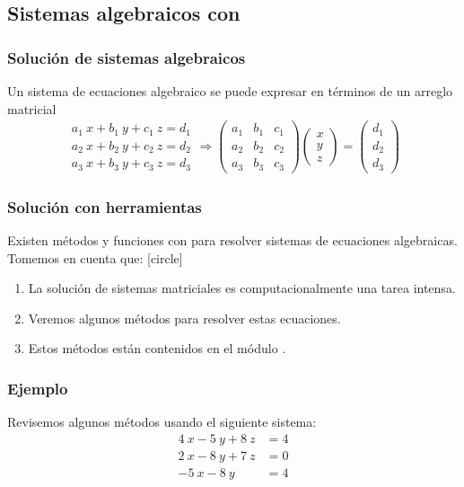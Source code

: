 \subsection{Sistemas algebraicos con \python}
\begin{frame}
\frametitle{Solución de sistemas algebraicos}
Un sistema de ecuaciones algebraico se puede expresar en términos de un arreglo matricial
\begin{align*}
\begin{aligned}
a_{1} \: x + b_{1} \: y + c_{1} \: z = d_{1} \\
a_{2} \: x + b_{2} \: y + c_{2} \: z = d_{2} \\
a_{3} \: x + b_{3} \: y + c_{3} \: z = d_{3} 
\end{aligned}
\Longrightarrow
\begin{pmatrix}
a_{1} & b_{1} & c_{1} \\ 
a_{2} & b_{2} & c_{2} \\
a_{3} & b_{3} & c_{3} 
\end{pmatrix}
\begin{pmatrix}
x \\
y \\
z
\end{pmatrix} = 
\begin{pmatrix}
d_{1} \\
d_{2} \\
d_{3}
\end{pmatrix}
\end{align*}
\end{frame}
\begin{frame}
\frametitle{Solución con herramientas}
Existen métodos y funciones con \python{} para resolver sistemas de ecuaciones algebraicas.
\\
\bigskip
Tomemos en cuenta que:
[circle]
\begin{enumerate}[<+->]
\item La solución de sistemas matriciales es computacionalmente una tarea intensa.
\item Veremos algunos métodos para resolver estas ecuaciones.
\item Estos métodos están contenidos en el módulo .
\end{enumerate}
\end{frame}
\begin{frame}
\frametitle{Ejemplo}
Revisemos algunos métodos usando el siguiente sistema:
\begin{align*}
4 \: x - 5 \: y + 8 \: z &= 4 \\
2 \: x - 8 \: y + 7 \: z &= 0 \\
-5 \: x - 8 \: y &= 4
\end{align*}
\end{frame}
